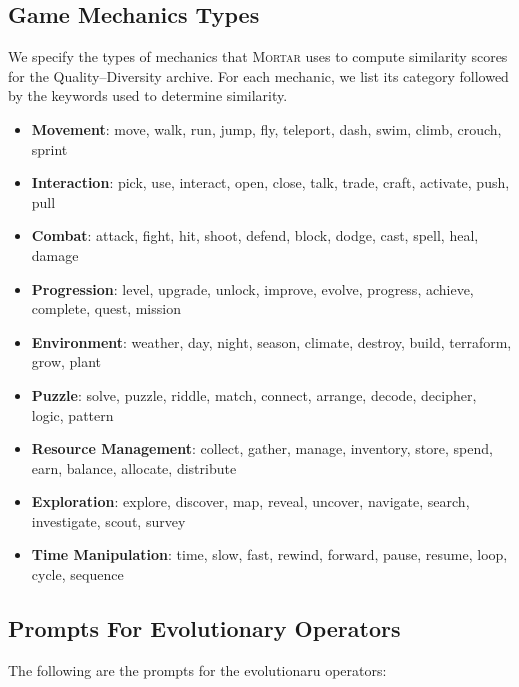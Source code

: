 \documentclass{article} %
\newcommand{\name}{\textsc{Mortar}}
\begin{document}
\subsection{Game Mechanics Types}

We specify the types of mechanics that \name{} uses to compute similarity scores for the Quality–Diversity archive. For each mechanic, we list its category followed by the keywords used to determine similarity.

 \begin{itemize}
     \item \textbf{Movement}: move, walk, run, jump, fly, teleport, dash, swim, climb, crouch, sprint
     \item \textbf{Interaction}: pick, use, interact, open, close, talk, trade, craft, activate, push, pull
     \item \textbf{Combat}: attack, fight, hit, shoot, defend, block, dodge, cast, spell, heal, damage
     \item \textbf{Progression}: level, upgrade, unlock, improve, evolve, progress, achieve, complete, quest, mission
     \item \textbf{Environment}: weather, day, night, season, climate, destroy, build, terraform, grow, plant
\item \textbf{Puzzle}: solve, puzzle, riddle, match, connect, arrange, decode, decipher, logic, pattern 
\item \textbf{Resource Management}: collect, gather, manage, inventory, store, spend, earn, balance, allocate, distribute 
\item \textbf{Exploration}: explore, discover, map, reveal, uncover, navigate, search, investigate, scout, survey 
\item \textbf{Time Manipulation}: time, slow, fast, rewind, forward, pause, resume, loop, cycle, sequence         

 \end{itemize}

\subsection{Prompts For Evolutionary Operators}

The following are the prompts for the evolutionaru operators:
\end{document}
